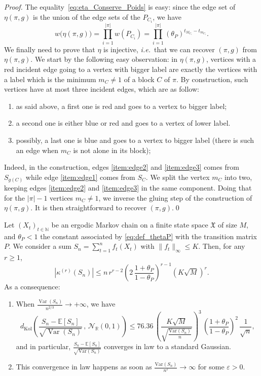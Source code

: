\documentclass[envcountsame]{svmult}
\def\ka{\kappa}
\newcommand{\N}{\mathbb{N}}
\newcommand{\R}{\mathbb{R}}
\newcommand{\esper}{\mathbb{E}}
\newcommand{\dkol}{d_\mathrm{Kol}}
\newcommand{\eps}{\varepsilon}
\newcommand{\spa}{\mathfrak{X}}
\newcommand{\var}{\mathrm{Var}}
\newcommand{\gauss}{\mathcal{N}_{\R}(0,1)}
\DeclareMathOperator{\Var}{Var}
\begin{document}
\begin{proof}
The equality~\eqref{eq:eta_Conserve_Poids} is easy:
since the edge set of $\eta(\pi,g)$ is the union of the edge sets of the $P_{C_i}$, we have
\[w\big( \eta(\pi,g) \big) = \prod_{i=1}^{|\pi|} w(P_{C_i}) = \prod_{i=1}^{|\pi|} (\theta_P)^{t_{M_{C_i}}-t_{m_{C_i}}}.\]
We finally need to prove that $\eta$ is injective, {\em i.e.}~that we can recover $(\pi,g)$ from $\eta(\pi,g)$.
We start by the following easy observation: in $\eta(\pi,g)$,
vertices with a red incident edge going to a vertex with bigger label
are exactly the vertices with a label which is the minimum $m_C \ne 1$ of a block $C$ of $\pi$.
By construction, such vertices have at most three incident edges, which are as follow:
\begin{enumerate}[label=(E\arabic*)]
  \item \label{item:edge2} as said above, a first one is red and goes to a vertex to bigger label;
  \item \label{item:edge3} a second one is either blue or red and goes to a vertex of lower label.
  \item \label{item:edge1} possibly, a last one is blue and goes to a vertex to bigger label (there is such an edge when $m_C$ is not alone in its block);
\end{enumerate}
Indeed, in the construction, edges \ref{item:edge2} and \ref{item:edge3} comes from $S_{g(C)}$
while edge \ref{item:edge1} comes from $S_C$.
We split the vertex $m_C$ into two, keeping edges \ref{item:edge2} and \ref{item:edge3}
in the same component.
Doing that for the $|\pi|-1$ vertices $m_C \ne 1$,
we inverse the gluing step of the construction of $\eta(\pi,g)$.
It is then straightforward to recover $(\pi,g)$.\qed
\end{proof}

\begin{theorem}\label{thm:kolmogorovmarkov}
  Let $(X_t)_{t \in \N}$ be an ergodic Markov chain on a finite state space $\spa$ of size $M$, and $\theta_P<1$ the constant associated by \eqref{eq:def_thetaP} with the transition matrix $P$.
  We consider a sum $S_n= \sum_{t = 1}^n f_t(X_t)$ with $\|f_t\|_{\infty} \le K$. Then, for any $r \ge 1$,
  \begin{equation}
    \left|\ka^{(r)}(S_n)\right| \le n \, r^{r-2}  \left(2\,\frac{1+\theta_P}{1-\theta_P}\right)^{r-1} \left(K\sqrt{M}\right)^r.
    \label{eq:BorneCumulantMarkov}
  \end{equation}
    As a consequence:
    \begin{enumerate}
     	\item When $\frac{\Var(S_n)}{n^{2/3}} \to +\infty$,
  we have
  \[\dkol\left( \frac{S_n-\esper[S_n]}{\sqrt{\Var(S_n)}}\,,\, \gauss \right)
  \le 76.36\,\left(\frac{K\sqrt{M}}{\sqrt{\frac{\var(S_n)}{n}}}\right)^{\!3}\,\left(\frac{1+\theta_P}{1-\theta_P}\right)^2\,\frac{1}{\sqrt{n}},\]
  and in particular, $\frac{S_n-\esper[S_n]}{\sqrt{\var(S_n)}}$ converges in law to a standard Gaussian.

  \item  This convergence in law happens as soon as $\frac{\var(S_n)}{n^{\eps}} \to \infty$ for some $\eps >0$.
     \end{enumerate} 
\end{theorem}
\end{document}

